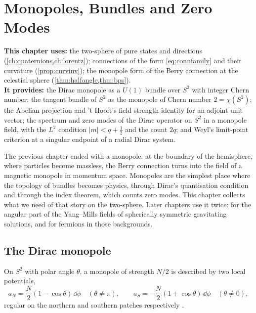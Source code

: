 \chapter{Monopoles, Bundles and Zero Modes}
\label{ch:monopoles}

\begin{usesbox}
\textbf{This chapter uses:} the two-sphere of pure states and directions (\cref{ch:quaternions,ch:lorentz}); connections of the form \eqref{eq:connfamily} and their curvature (\cref{prop:curvinv}); the monopole form of the Berry connection at the celestial sphere (\cref{thm:halfangle,thm:bps}).\\
\textbf{It provides:} the Dirac monopole as a $U(1)$ bundle over $S^2$ with integer Chern number; the tangent bundle of $S^2$ as the monopole of Chern number $2=\chi(S^2)$; the Abelian projection and 't Hooft's field-strength identity for an adjoint unit vector; the spectrum and zero modes of the Dirac operator on $S^2$ in a monopole field, with the $L^2$ condition $|m|<q+\frac12$ and the count $2q$; and Weyl's limit-point criterion at a singular endpoint of a radial Dirac system.
\end{usesbox}

The previous chapter ended with a monopole: at the boundary of the hemisphere, where particles become massless, the Berry connection turns into the field of a magnetic monopole in momentum space. Monopoles are the simplest place where the topology of bundles becomes physics, through Dirac's quantisation condition and through the index theorem, which counts zero modes. This chapter collects what we need of that story on the two-sphere. Later chapters use it twice: for the angular part of the Yang--Mills fields of spherically symmetric gravitating solutions, and for fermions in those backgrounds.

\section{The Dirac monopole}

On $S^2$ with polar angle $\theta$, a monopole of strength $N/2$ is described by two local potentials,
\[
a_N=\frac N2(1-\cos\theta)\,\dd\phi\quad(\theta\ne\pi),\qquad a_S=-\frac N2(1+\cos\theta)\,\dd\phi\quad(\theta\ne0),
\]
regular on the northern and southern patches respectively \cite{WuYang1975}.

